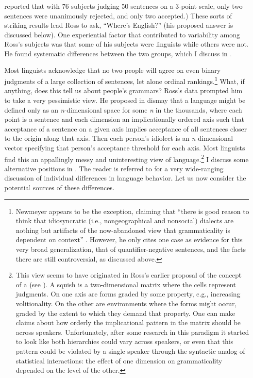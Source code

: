  reported that with 76 subjects judging  50 sentences on a 3-point scale, only two sentences were unanimously rejected, and only two accepted.) These sorts of striking results lead Ross to ask, ``Where's English?'' (his proposed answer is discussed below). One experiential factor that contributed to variability among Ross's subjects was that some of his subjects were linguists while others were not. He found systematic differences between the two groups, which I discuss in .

Most linguists acknowledge that no two people will agree on even binary judgments of a large collection of sentences, let alone ordinal rankings.\footnote{Newmeyer appears to be the exception, claiming that ``there is good reason to think that idiosyncratic (i.e., nongeographical and nonsocial) dialects are nothing but artifacts of the now-abandoned view that grammaticality is dependent on context'' \citep[57]{Newmeyer1983}. However, he only cites one case as evidence for this very broad generalization, that of quantifier-negative sentences, and the facts there are still controversial, as discussed above.}
 What, if anything, does this tell us about people's grammars? Ross's data prompted him to take a very pessimistic view. He proposed in dismay that a language might be defined only as an \textit{n}-dimensional space for some \textit{n} in the thousands, where each point is a sentence and each dimension an implicationally ordered axis such that acceptance of a sentence on a given axis implies acceptance of all sentences closer to the origin along that axis. Then each person's idiolect is an \textit{n}-dimensional vector specifying that person's acceptance threshold for each axis. Most linguists find this an appallingly messy and uninteresting view of language.\footnote{This view seems to have originated in Ross's earlier proposal of the concept of a  (see ). A squish is a two-dimensional matrix where the cells represent judgments. On one axis are forms graded by some property, e.g., increasing volitionality. On the other are environments where the forms might occur, graded by the extent to which they demand that property. One can make claims about how orderly the implicational pattern in the matrix should be across speakers. Unfortunately, after some research in this paradigm it started to look like both hierarchies could vary across speakers, or even that this pattern could be violated by a single speaker through the syntactic analog of statistical interactions: the effect of one dimension on grammaticality depended on the level of the other.
} 
I discuss some alternative positions in . The reader is referred to \citet{FillmoreEtAl1979a} for a very wide-ranging discussion of individual differences in language behavior. Let us now consider the potential sources of these differences.

